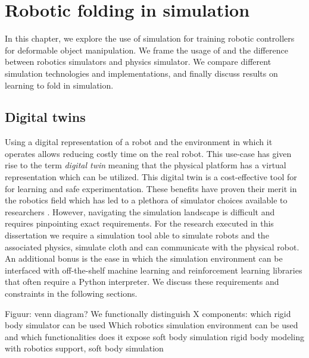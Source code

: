 \documentclass[\home/main.tex]{subfiles}
\begin{document}
\graphicspath{{\home/figures}}

\chapter{Robotic folding in simulation}\label{ch:simulation}


In this chapter, we explore the use of simulation for training robotic controllers for deformable object manipulation. We frame the usage of and the difference between robotics simulators and physics simulator. We compare different simulation technologies and implementations, and finally discuss results on learning to fold in simulation. 

\section{Digital twins}

Using a digital representation of a robot and the environment in which it operates allows reducing costly time on the real robot. This use-case has given rise to the term \emph{digital twin} meaning that the physical platform has a virtual representation which can be utilized. This digital twin is a cost-effective tool for for learning and safe experimentation. These benefits have proven their merit in the robotics field which has led to a plethora of simulator choices available to researchers \autocite{Collins2021}. However, navigating the simulation landscape is difficult and requires pinpointing exact requirements. For the research executed in this dissertation we require a simulation tool able to simulate robots and the associated physics, simulate cloth and can communicate with the physical robot. An additional bonus is the ease in which the simulation environment can be interfaced with off-the-shelf machine learning and reinforcement learning libraries that often require a Python interpreter. 
We discuss these requirements and constraints in the following sections. 

Figuur: venn diagram? 
We functionally distinguish X components: 
    which rigid body simulator can be used
    Which robotics simulation environment can be used and which functionalities does it expose 
    soft body simulation 
rigid body modeling with robotics support, soft body simulation

\end{document}
